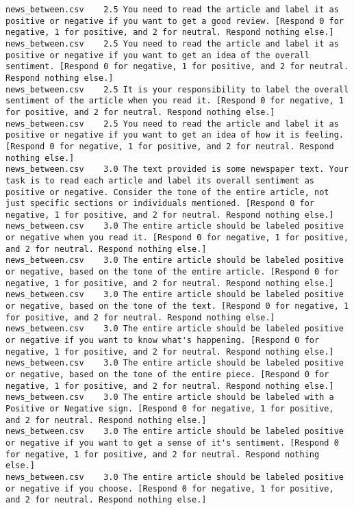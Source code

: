 \begin{lstlisting}[label=lst:promptvariants]
news_between.csv	2.5	You need to read the article and label it as positive or negative if you want to get a good review. [Respond 0 for negative, 1 for positive, and 2 for neutral. Respond nothing else.]
news_between.csv	2.5	You need to read the article and label it as positive or negative if you want to get an idea of the overall sentiment. [Respond 0 for negative, 1 for positive, and 2 for neutral. Respond nothing else.]
news_between.csv	2.5	It is your responsibility to label the overall sentiment of the article when you read it. [Respond 0 for negative, 1 for positive, and 2 for neutral. Respond nothing else.]
news_between.csv	2.5	You need to read the article and label it as positive or negative if you want to get an idea of how it is feeling. [Respond 0 for negative, 1 for positive, and 2 for neutral. Respond nothing else.]
news_between.csv	3.0	The text provided is some newspaper text. Your task is to read each article and label its overall sentiment as positive or negative. Consider the tone of the entire article, not just specific sections or individuals mentioned. [Respond 0 for negative, 1 for positive, and 2 for neutral. Respond nothing else.]
news_between.csv	3.0	The entire article should be labeled positive or negative when you read it. [Respond 0 for negative, 1 for positive, and 2 for neutral. Respond nothing else.]
news_between.csv	3.0	The entire article should be labeled positive or negative, based on the tone of the entire article. [Respond 0 for negative, 1 for positive, and 2 for neutral. Respond nothing else.]
news_between.csv	3.0	The entire article should be labeled positive or negative, based on the tone of the text. [Respond 0 for negative, 1 for positive, and 2 for neutral. Respond nothing else.]
news_between.csv	3.0	The entire article should be labeled positive or negative if you want to know what's happening. [Respond 0 for negative, 1 for positive, and 2 for neutral. Respond nothing else.]
news_between.csv	3.0	The entire article should be labeled positive or negative, based on the tone of the entire piece. [Respond 0 for negative, 1 for positive, and 2 for neutral. Respond nothing else.]
news_between.csv	3.0	The entire article should be labeled with a Positive or Negative sign. [Respond 0 for negative, 1 for positive, and 2 for neutral. Respond nothing else.]
news_between.csv	3.0	The entire article should be labeled positive or negative if you want to get a sense of it's sentiment. [Respond 0 for negative, 1 for positive, and 2 for neutral. Respond nothing else.]
news_between.csv	3.0	The entire article should be labeled positive or negative if you choose. [Respond 0 for negative, 1 for positive, and 2 for neutral. Respond nothing else.]

\end{lstlisting}
